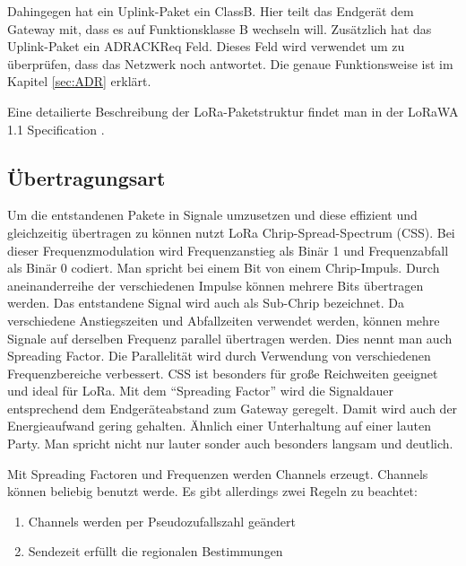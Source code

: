 \documentclass[a4paper, 12pt]{article}
\begin{document}
                Dahingegen hat ein Uplink-Paket ein ClassB. Hier teilt das Endgerät dem Gateway mit, dass es auf 
                Funktionsklasse B wechseln will. Zusätzlich hat das Uplink-Paket ein ADRACKReq Feld. Dieses Feld 
                wird verwendet um zu überprüfen, dass das Netzwerk noch antwortet. 
                Die genaue Funktionsweise ist im Kapitel \ref{sec:ADR}  erklärt.

                Eine detailierte Beschreibung der LoRa-Paketstruktur findet man in der LoRaWA 1.1 Specification \cite{LoRaSpec}.   
                
                
        \subsection{Übertragungsart}\label{sec:Modulation}
            Um die entstandenen Pakete in Signale umzusetzen und diese effizient und gleichzeitig übertragen zu können
            nutzt LoRa Chrip-Spread-Spectrum (CSS). Bei dieser Frequenzmodulation wird Frequenzanstieg als Binär 1 und 
            Frequenzabfall als Binär 0 codiert. Man spricht bei einem Bit von einem Chrip-Impuls. Durch 
            aneinanderreihe der verschiedenen Impulse können mehrere Bits übertragen werden. Das entstandene Signal 
            wird auch als Sub-Chrip bezeichnet. Da verschiedene Anstiegszeiten und Abfallzeiten verwendet werden, können  
            mehre Signale auf derselben Frequenz parallel übertragen werden. Dies nennt man auch Spreading Factor. 
            Die Parallelität wird durch Verwendung von verschiedenen Frequenzbereiche verbessert. 
            CSS ist besonders für große Reichweiten geeignet und ideal für LoRa. 
            Mit dem ``Spreading Factor'' wird die Signaldauer entsprechend dem Endgeräteabstand zum Gateway geregelt.
            Damit wird auch der Energieaufwand gering gehalten. Ähnlich einer Unterhaltung auf einer lauten Party. 
            Man spricht nicht nur lauter sonder auch besonders langsam und deutlich.\cite{explain}

            Mit Spreading Factoren und Frequenzen werden Channels erzeugt. Channels können 
            beliebig benutzt werde. Es gibt allerdings zwei Regeln zu beachtet: 
            \begin{enumerate}   
                \item Channels werden per Pseudozufallszahl geändert
                \item Sendezeit erfüllt die regionalen Bestimmungen
            \end{enumerate}
            
\end{document}
